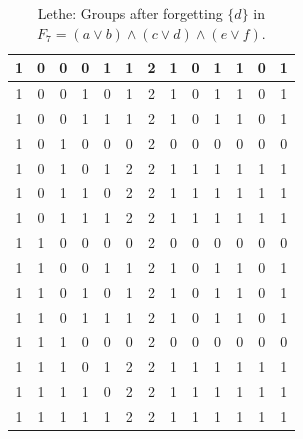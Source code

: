 \begin{table}[!tb]
\begin{tabular}{|c|c|c|c|c|c|c|c|c|c|c|c|c|}
        \rowcolor{red!40} 1 & 0 & 0 & 0 & 1 & 1 & 2 & 1 & 0 & 1 & 1 & 0 & 1 \\ \hline
        \rowcolor{green!40} 1 & 0 & 0 & 1 & 0 & 1 & 2 & 1 & 0 & 1 & 1 & 0 & 1 \\ \hline
        \rowcolor{yellow!40} 1 & 0 & 0 & 1 & 1 & 1 & 2 & 1 & 0 & 1 & 1 & 0 & 1 \\ \hline
        \rowcolor{gray!40} 1 & 0 & 1 & 0 & 0 & 0 & 2 & 0 & 0 & 0 & 0 & 0 & 0 \\ \hline
        \rowcolor{blue!40} 1 & 0 & 1 & 0 & 1 & 2 & 2 & 1 & 1 & 1 & 1 & 1 & 1 \\ \hline
        \rowcolor{red!40} 1 & 0 & 1 & 1 & 0 & 2 & 2 & 1 & 1 & 1 & 1 & 1 & 1 \\ \hline
        \rowcolor{green!40} 1 & 0 & 1 & 1 & 1 & 2 & 2 & 1 & 1 & 1 & 1 & 1 & 1 \\ \hline
        \rowcolor{yellow!40} 1 & 1 & 0 & 0 & 0 & 0 & 2 & 0 & 0 & 0 & 0 & 0 & 0 \\ \hline
        \rowcolor{gray!40} 1 & 1 & 0 & 0 & 1 & 1 & 2 & 1 & 0 & 1 & 1 & 0 & 1 \\ \hline
        \rowcolor{blue!40} 1 & 1 & 0 & 1 & 0 & 1 & 2 & 1 & 0 & 1 & 1 & 0 & 1 \\ \hline
        \rowcolor{red!40} 1 & 1 & 0 & 1 & 1 & 1 & 2 & 1 & 0 & 1 & 1 & 0 & 1 \\ \hline
        \rowcolor{green!40} 1 & 1 & 1 & 0 & 0 & 0 & 2 & 0 & 0 & 0 & 0 & 0 & 0 \\ \hline
        \rowcolor{yellow!40} 1 & 1 & 1 & 0 & 1 & 2 & 2 & 1 & 1 & 1 & 1 & 1 & 1 \\ \hline
        \rowcolor{gray!40} 1 & 1 & 1 & 1 & 0 & 2 & 2 & 1 & 1 & 1 & 1 & 1 & 1 \\ \hline
        \rowcolor{blue!40} 1 & 1 & 1 & 1 & 1 & 2 & 2 & 1 & 1 & 1 & 1 & 1 & 1 \\ \hline
    \end{tabular}
    \caption{Lethe: Groups after forgetting $\{d\}$ in $F_{7} = (a \lor b) \land (c \lor d) \land (e \lor f)$.}
    \label{tab:lethe-F7-d-groups}
\end{table}
